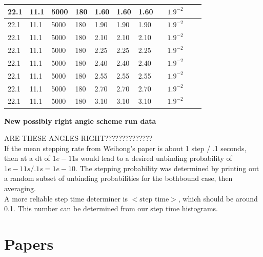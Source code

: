 \documentclass[10pt]{article} %
\begin{document}
\begin{center}
\begin{tabular}{| l | l | l | l | l | l | l | p{3cm} | p{2cm} | l | p{5cm} |}
    22.1 & 11.1 & 5000 &  180 & 1.60 & 1.60 & 1.60 & & $1.9^{-2}$ & & \\\hline
    22.1 & 11.1 & 5000 &  180 & 1.90 & 1.90 & 1.90 & & $1.9^{-2}$ & & \\\hline
    22.1 & 11.1 & 5000 &  180 & 2.10 & 2.10 & 2.10 & & $1.9^{-2}$ & & \\\hline
    22.1 & 11.1 & 5000 &  180 & 2.25 & 2.25 & 2.25 & & $1.9^{-2}$ & & \\\hline
    22.1 & 11.1 & 5000 &  180 & 2.40 & 2.40 & 2.40 & & $1.9^{-2}$ & & \\\hline
    22.1 & 11.1 & 5000 &  180 & 2.55 & 2.55 & 2.55 & & $1.9^{-2}$ & & \\\hline
    22.1 & 11.1 & 5000 &  180 & 2.70 & 2.70 & 2.70 & & $1.9^{-2}$ & & \\\hline
    22.1 & 11.1 & 5000 &  180 & 3.10 & 3.10 & 3.10 & & $1.9^{-2}$ & & \\\hline
  \end{tabular}
  \textbf{New possibly right angle scheme run data}
\end{center}

ARE THESE ANGLES RIGHT??????????????\\

If the mean stepping rate from Weihong's paper is about 1 step / .1 seconds, then at a dt of $1e-11$s would lead to a desired unbinding
probability of $1e-11s/.1s = 1e-10$. The stepping probability was determined by printing out a random subset of unbinding probabilities
for the bothbound case, then averaging.\\

A more reliable step time determiner is $\Big<\mbox{step time}\Big>$, which should be around 0.1. This number can be determined from our step time histograms.\\

\section{Papers}
\end{document}
